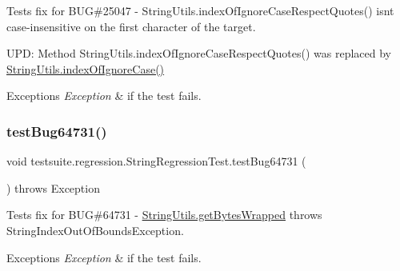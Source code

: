Tests fix for B\+UG\#25047 -\/ String\+Utils.\+index\+Of\+Ignore\+Case\+Respect\+Quotes() isn\textquotesingle{}t case-\/insensitive on the first character of the target.

U\+PD\+: Method String\+Utils.\+index\+Of\+Ignore\+Case\+Respect\+Quotes() was replaced by \mbox{\hyperlink{classcom_1_1mysql_1_1cj_1_1util_1_1_string_utils_a04e388c77ef24c2d95cdc76b3aef7be9}{String\+Utils.\+index\+Of\+Ignore\+Case()}}


\begin{DoxyExceptions}{Exceptions}
{\em Exception} & if the test fails. \\
\hline
\end{DoxyExceptions}
\mbox{\label{classtestsuite_1_1regression_1_1_string_regression_test_a7e24a2a41964d76d3b5b82b5a064d820}} 
\subsubsection{\texorpdfstring{test\+Bug64731()}{testBug64731()}}
{\footnotesize\ttfamily void testsuite.\+regression.\+String\+Regression\+Test.\+test\+Bug64731 (\begin{DoxyParamCaption}{ }\end{DoxyParamCaption}) throws Exception}

Tests fix for B\+UG\#64731 -\/ \mbox{\hyperlink{classcom_1_1mysql_1_1cj_1_1util_1_1_string_utils_aa586cd6c16fa10c7a9d6f29d06fcfd9d}{String\+Utils.\+get\+Bytes\+Wrapped}} throws String\+Index\+Out\+Of\+Bounds\+Exception.


\begin{DoxyExceptions}{Exceptions}
{\em Exception} & if the test fails. \\
\hline
\end{DoxyExceptions}
\mbox{\label{classtestsuite_1_1regression_1_1_string_regression_test_a7daa6aace5462393758a0ccdcb6dd4c9}} 
